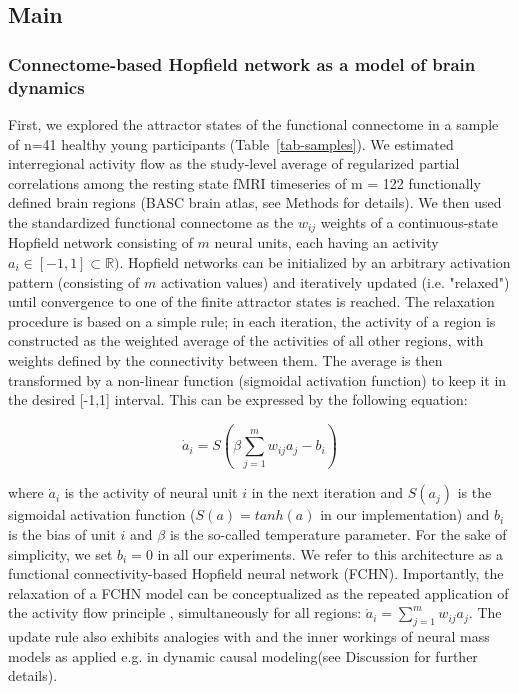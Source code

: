 \documentclass{article}
\begin{document}
\subsection{Main}\label{Main}

\subsubsection{Connectome-based Hopfield network as a model of brain dynamics}\label{Connectome-based Hopfield network as a model of brain dynamics}

First, we explored the attractor states of the functional connectome in a sample of n=41 healthy young
participants (Table~\ref{tab-samples}). We estimated interregional activity flow \citep{cole2016activity, ito2017cognitive}
as the study-level average of regularized partial correlations among the resting state fMRI timeseries of m = 122
functionally defined brain regions (BASC brain atlas, see Methods for details). We then used the standardized
functional connectome as the $w_{ij}$  weights of a continuous-state Hopfield network
\citep{hopfield1982neural, koiran1994dynamics} consisting of $m$ neural units, each having an activity
$a_i \in [ -1,1] \subset \mathbb{R})$. Hopfield networks can be initialized by an arbitrary activation pattern (consisting of
$m$ activation values) and iteratively updated (i.e. "relaxed") until convergence to one of the finite attractor states is reached. The relaxation procedure is based on a simple rule; in each iteration, the activity of a region is constructed as the weighted average of the activities of all other regions, with weights defined by the connectivity between them. The average is then transformed by a non-linear function (sigmoidal activation function) to keep it in the desired [-1,1] interval.
This can be expressed by the following equation:

\begin{equation}
\label{hopfield-update}
\dot{a}_i = S(\beta \sum_{j=1}^m w_{ij}a_j - b_i)
\end{equation}

where $\dot{a}_i$ is the activity of neural unit $i$ in the next iteration and $S(a_j)$ is the sigmoidal activation
function ($S(a) = tanh(a)$ in our implementation) and $b_i$ is the bias of unit $i$ and $\beta$ is the so-called temperature parameter. For the sake of simplicity, we set $b_i=0$ in all our experiments. We refer to this architecture as a functional connectivity-based Hopfield neural network (FCHN). Importantly, the relaxation of a FCHN model can be conceptualized as the repeated
application of the activity flow principle \citep{cole2016activity, ito2017cognitive} , simultaneously for all
regions: $\dot{a}_i = \sum_{j=1}^m w_{ij}a_j$. The update rule also exhibits analogies with  \citep{gu2015controllability} and the inner workings of neural mass models \citep{breakspear2017dynamic} as applied e.g. in dynamic causal modeling(see Discussion for further details).
\end{document}
